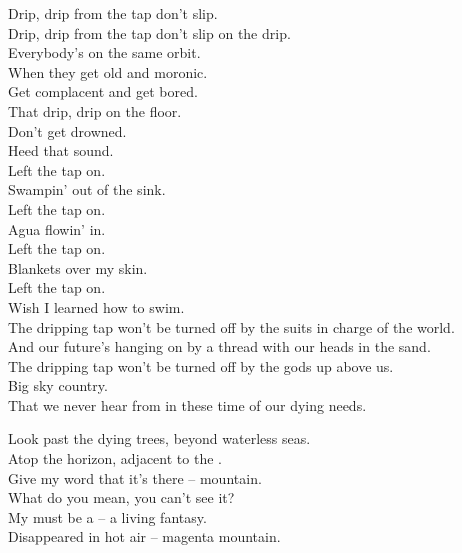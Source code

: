 Drip, drip from the tap don't slip. \\
Drip, drip from the tap don't slip on the drip. \\

Everybody's on the same orbit. \\
When they get old and moronic. \\
Get complacent and get bored. \\
That drip, drip on the floor. \\

Don't get drowned. \\
Heed that sound. \\

Left the tap on. \\
Swampin' out of the sink. \\
Left the tap on. \\
Agua flowin' in. \\
Left the tap on. \\
Blankets over my skin. \\
Left the tap on. \\
Wish I learned how to swim. \\

The dripping tap won't be turned off by the suits in charge of the world. \\
And our future's hanging on by a thread with our heads in the sand. \\
The dripping tap won't be turned off by the gods up above us. \\
Big sky country. \\
That we never hear from in these time of our dying needs. \\




Look past the dying trees, beyond waterless seas. \\
Atop the horizon, adjacent to the . \\
Give my word that it's there --  mountain. \\

What do you mean, you can't see it? \\
My  must be a  -- a living fantasy. \\
Disappeared in hot air -- magenta mountain. \\

